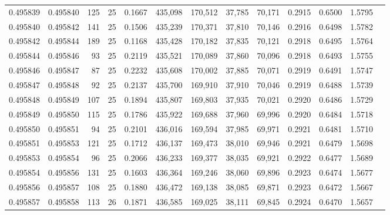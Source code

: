 \begin{tabular}{rrrrrrrrrrrrr}
0.495839 & 0.495840 &   125 &  25 &                                     0.1667 & 435,098 & 170,512 &  37,785 &  70,171 & 0.2915 & 0.6500 & 1.5795 \\
0.495840 & 0.495842 &   141 &  25 &                                     0.1506 & 435,239 & 170,371 &  37,810 &  70,146 & 0.2916 & 0.6498 & 1.5782 \\
0.495842 & 0.495844 &   189 &  25 &                                     0.1168 & 435,428 & 170,182 &  37,835 &  70,121 & 0.2918 & 0.6495 & 1.5764 \\
0.495844 & 0.495846 &    93 &  25 &                                     0.2119 & 435,521 & 170,089 &  37,860 &  70,096 & 0.2918 & 0.6493 & 1.5755 \\
0.495846 & 0.495847 &    87 &  25 &                                     0.2232 & 435,608 & 170,002 &  37,885 &  70,071 & 0.2919 & 0.6491 & 1.5747 \\
0.495847 & 0.495848 &    92 &  25 &                                     0.2137 & 435,700 & 169,910 &  37,910 &  70,046 & 0.2919 & 0.6488 & 1.5739 \\
0.495848 & 0.495849 &   107 &  25 &                                     0.1894 & 435,807 & 169,803 &  37,935 &  70,021 & 0.2920 & 0.6486 & 1.5729 \\
0.495849 & 0.495850 &   115 &  25 &                                     0.1786 & 435,922 & 169,688 &  37,960 &  69,996 & 0.2920 & 0.6484 & 1.5718 \\
0.495850 & 0.495851 &    94 &  25 &                                     0.2101 & 436,016 & 169,594 &  37,985 &  69,971 & 0.2921 & 0.6481 & 1.5710 \\
0.495851 & 0.495853 &   121 &  25 &                                     0.1712 & 436,137 & 169,473 &  38,010 &  69,946 & 0.2921 & 0.6479 & 1.5698 \\
0.495853 & 0.495854 &    96 &  25 &                                     0.2066 & 436,233 & 169,377 &  38,035 &  69,921 & 0.2922 & 0.6477 & 1.5689 \\
0.495854 & 0.495856 &   131 &  25 &                                     0.1603 & 436,364 & 169,246 &  38,060 &  69,896 & 0.2923 & 0.6474 & 1.5677 \\
0.495856 & 0.495857 &   108 &  25 &                                     0.1880 & 436,472 & 169,138 &  38,085 &  69,871 & 0.2923 & 0.6472 & 1.5667 \\
0.495857 & 0.495858 &   113 &  26 &                                     0.1871 & 436,585 & 169,025 &  38,111 &  69,845 & 0.2924 & 0.6470 & 1.5657 \\

\end{tabular}
